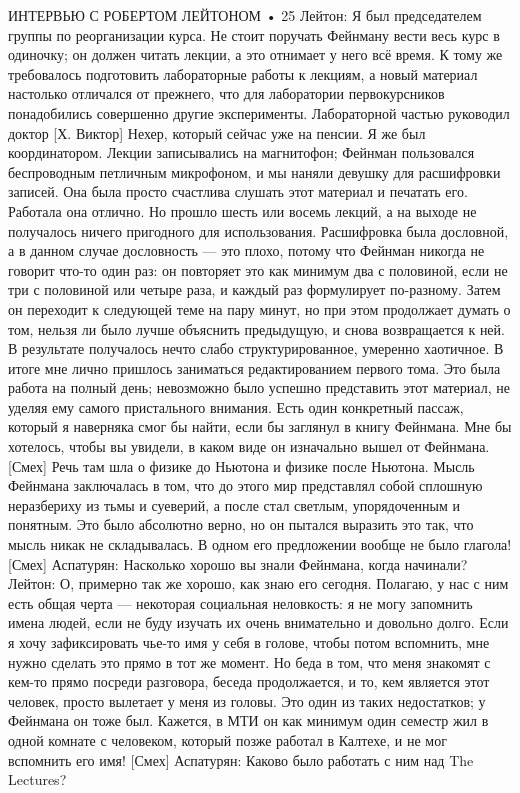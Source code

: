 \documentclass[11pt,oneside]{article}
\begin{document}
ИНТЕРВЬЮ С РОБЕРТОМ ЛЕЙТОНОМ • 25 Лейтон: Я был председателем группы по реорганизации курса. Не стоит поручать Фейнману вести весь курс в одиночку; он должен читать лекции, а это отнимает у него всё время. К тому же требовалось подготовить лабораторные работы к лекциям, а новый материал настолько отличался от прежнего, что для лаборатории первокурсников понадобились совершенно другие эксперименты. Лабораторной частью руководил доктор [Х. Виктор] Нехер, который сейчас уже на пенсии. Я же был координатором. Лекции записывались на магнитофон; Фейнман пользовался беспроводным петличным микрофоном, и мы наняли девушку для расшифровки записей. Она была просто счастлива слушать этот материал и печатать его. Работала она отлично. Но прошло шесть или восемь лекций, а на выходе не получалось ничего пригодного для использования. Расшифровка была дословной, а в данном случае дословность --- это плохо, потому что Фейнман никогда не говорит что-то один раз: он повторяет это как минимум два с половиной, если не три с половиной или четыре раза, и каждый раз формулирует по-разному. Затем он переходит к следующей теме на пару минут, но при этом продолжает думать о том, нельзя ли было лучше объяснить предыдущую, и снова возвращается к ней. В результате получалось нечто слабо структурированное, умеренно хаотичное. В итоге мне лично пришлось заниматься редактированием первого тома. Это была работа на полный день; невозможно было успешно представить этот материал, не уделяя ему самого пристального внимания. Есть один конкретный пассаж, который я наверняка смог бы найти, если бы заглянул в книгу Фейнмана. Мне бы хотелось, чтобы вы увидели, в каком виде он изначально вышел от Фейнмана. [Смех] Речь там шла о физике до Ньютона и физике после Ньютона. Мысль Фейнмана заключалась в том, что до этого мир представлял собой сплошную неразбериху из тьмы и суеверий, а после стал светлым, упорядоченным и понятным. Это было абсолютно верно, но он пытался выразить это так, что мысль никак не складывалась. В одном его предложении вообще не было глагола! [Смех] Аспатурян: Насколько хорошо вы знали Фейнмана, когда начинали? Лейтон: О, примерно так же хорошо, как знаю его сегодня. Полагаю, у нас с ним есть общая черта --- некоторая социальная неловкость: я не могу запомнить имена людей, если не буду изучать их очень внимательно и довольно долго. Если я хочу зафиксировать чье-то имя у себя в голове, чтобы потом вспомнить, мне нужно сделать это прямо в тот же момент. Но беда в том, что меня знакомят с кем-то прямо посреди разговора, беседа продолжается, и то, кем является этот человек, просто вылетает у меня из головы. Это один из таких недостатков; у Фейнмана он тоже был. Кажется, в МТИ он как минимум один семестр жил в одной комнате с человеком, который позже работал в Калтехе, и не мог вспомнить его имя! [Смех] Аспатурян: Каково было работать с ним над The Lectures?\par
\end{document}
